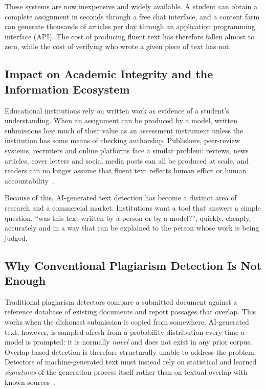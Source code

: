These systems are now inexpensive and widely available. A student can obtain
a complete assignment in seconds through a free chat interface, and a content
farm can generate thousands of articles per day through an application
programming interface (API). The cost of producing fluent text has therefore
fallen almost to zero, while the cost of verifying who wrote a given piece of
text has not.

\subsection{Impact on Academic Integrity and the Information Ecosystem}

Educational institutions rely on written work as evidence of a student's
understanding. When an assignment can be produced by a model, written
submissions lose much of their value as an assessment instrument unless the
institution has some means of checking authorship. Publishers, peer-review
systems, recruiters and online platforms face a similar problem: reviews,
news articles, cover letters and social media posts can all be produced at
scale, and readers can no longer assume that fluent text reflects human effort
or human accountability~\cite{zellers2019grover,tang2024science}.

Because of this, AI-generated text detection has become a distinct area of
research and a commercial market. Institutions want a tool that answers a
simple question, ``was this text written by a person or by a model?'', quickly,
cheaply, accurately and in a way that can be explained to the person whose
work is being judged.

\subsection{Why Conventional Plagiarism Detection Is Not Enough}

Traditional plagiarism detectors compare a submitted document against a
reference database of existing documents and report passages that overlap.
This works when the dishonest submission is copied from somewhere. AI-generated
text, however, is sampled afresh from a probability distribution every time a
model is prompted: it is normally \emph{novel} and does not exist in any prior
corpus. Overlap-based detection is therefore structurally unable to address
the problem. Detectors of machine-generated text must instead rely on
statistical and learned \emph{signatures} of the generation process itself
rather than on textual overlap with known sources~\cite{wu2025survey}.

